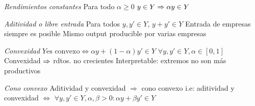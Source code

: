 \documentclass{nuevotema}
\begin{document}
\begin{esquemal}
				\4[(ix)] \textit{Rendimientos constantes}
				\4[] Para todo $\alpha \geq 0$
				\4[] $y \in Y \Rightarrow \alpha y \in Y$
				\4[] 
		
				\4[(x)] \textit{Aditividad o libre entrada}
				\4[] Para todos $y, y' \in Y$, $y+y' \in Y$
				\4[] Entrada de empresas siempre es posible
				\4[] Mismo output producible por varias empresas
				\4[] 
				
				\4[(xi)] \textit{Convexidad}
				\4[] $Y \text{es convexo} \iff \alpha y + (1-\alpha) y' \in Y $
				\4[] $\forall y, y' \in Y, \alpha \in [0,1]$
				\4[] Convexidad $\Rightarrow$ rdtos. no crecientes
				\4[] Interpretable: extremos no son más productivos
				\4[] 
				
				\4[xii] \textit{Cono convexo}
				\4[] Aditividad y convexidad $\Rightarrow$ cono convexo
				\4[] i.e: aditividad y convexidad
				\4[] $\iff$ $\forall y, y' \in Y, \alpha, \beta > 0: \alpha y + \beta y' \in Y$
				\4[] 
				

\end{esquemal}
\end{document}
